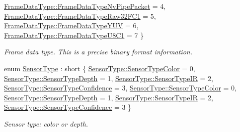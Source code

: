 \begin{DoxyCompactItemize}
\newline
\hyperlink{namespacemoetsi_1_1ssp_aa9b059f0bc7a91855545ee887f2d56c4a1628ff13722acd71d3e90b51c8faa31c}{Frame\+Data\+Type\+::\+Frame\+Data\+Type\+Nv\+Pipe\+Packet} = 4, 
\hyperlink{namespacemoetsi_1_1ssp_aa9b059f0bc7a91855545ee887f2d56c4abb6735708adc6efcecf59e0e1e6c9387}{Frame\+Data\+Type\+::\+Frame\+Data\+Type\+Raw32\+F\+C1} = 5, 
\hyperlink{namespacemoetsi_1_1ssp_aa9b059f0bc7a91855545ee887f2d56c4a6191c61c70f47aa00e2f9251d8ad59fa}{Frame\+Data\+Type\+::\+Frame\+Data\+Type\+Y\+UV} = 6, 
\hyperlink{namespacemoetsi_1_1ssp_aa9b059f0bc7a91855545ee887f2d56c4acd5fc2d48d13ef44a9806046ae34d56b}{Frame\+Data\+Type\+::\+Frame\+Data\+Type\+U8\+C1} = 7
 \}\begin{DoxyCompactList}\small\item\em Frame data type. This is a precise binary format information. \end{DoxyCompactList}
\item 
enum \hyperlink{namespacemoetsi_1_1ssp_abd5a57e44ab71b73d2e32a59887474de}{Sensor\+Type} \+: short \{ \newline
\hyperlink{namespacemoetsi_1_1ssp_abd5a57e44ab71b73d2e32a59887474dea896d4c904dda3d40337f16257ad819c9}{Sensor\+Type\+::\+Sensor\+Type\+Color} = 0, 
\hyperlink{namespacemoetsi_1_1ssp_abd5a57e44ab71b73d2e32a59887474dea38c56a32340ea03dd83b817cdbc15dd9}{Sensor\+Type\+::\+Sensor\+Type\+Depth} = 1, 
\hyperlink{namespacemoetsi_1_1ssp_abd5a57e44ab71b73d2e32a59887474dea06604c7f56c3ee7bcc422afac6239543}{Sensor\+Type\+::\+Sensor\+Type\+IR} = 2, 
\hyperlink{namespacemoetsi_1_1ssp_abd5a57e44ab71b73d2e32a59887474dea8fc6ffe5307d7e91425ea4a160a45fa2}{Sensor\+Type\+::\+Sensor\+Type\+Confidence} = 3, 
\newline
\hyperlink{namespacemoetsi_1_1ssp_abd5a57e44ab71b73d2e32a59887474dea896d4c904dda3d40337f16257ad819c9}{Sensor\+Type\+::\+Sensor\+Type\+Color} = 0, 
\hyperlink{namespacemoetsi_1_1ssp_abd5a57e44ab71b73d2e32a59887474dea38c56a32340ea03dd83b817cdbc15dd9}{Sensor\+Type\+::\+Sensor\+Type\+Depth} = 1, 
\hyperlink{namespacemoetsi_1_1ssp_abd5a57e44ab71b73d2e32a59887474dea06604c7f56c3ee7bcc422afac6239543}{Sensor\+Type\+::\+Sensor\+Type\+IR} = 2, 
\hyperlink{namespacemoetsi_1_1ssp_abd5a57e44ab71b73d2e32a59887474dea8fc6ffe5307d7e91425ea4a160a45fa2}{Sensor\+Type\+::\+Sensor\+Type\+Confidence} = 3
 \}\begin{DoxyCompactList}\small\item\em Sensor type\+: color or depth. \end{DoxyCompactList}
\end{DoxyCompactItemize}
